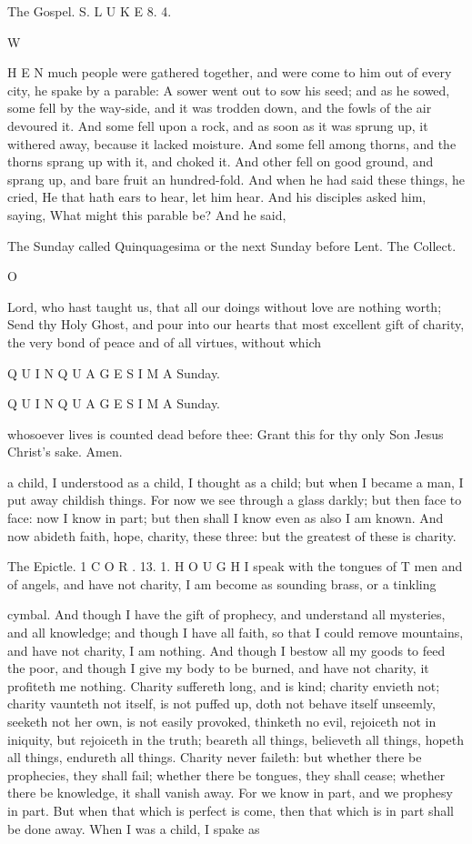 The Gospel. S. L U K E 8. 4.

W

H E N much people were gathered together, and were come to him out of every city, he spake by a parable: A sower went out to sow his seed; and as he sowed, some fell by the way-side, and it was trodden down, and the fowls of the air devoured it. And some fell upon a rock, and as soon as it was sprung up, it withered away, because it lacked moisture. And some fell among thorns, and the thorns sprang up with it, and choked it. And other fell on good ground, and sprang up, and bare fruit an hundred-fold. And when he had said these things, he cried, He that hath ears to hear, let him hear. And his disciples asked him, saying, What might this parable be? And he said,

The Sunday called Quinquagesima or the next Sunday before Lent. The Collect.

O

Lord, who hast taught us, that all our doings without love are nothing worth; Send thy Holy Ghost, and pour into our hearts that most excellent gift of charity, the very bond of peace and of all virtues, without which

Q U I N Q U A G E S I M A Sunday.

Q U I N Q U A G E S I M A Sunday.

whosoever lives is counted dead before thee: Grant this for thy only Son Jesus Christ's sake. Amen.

a child, I understood as a child, I thought as a child; but when I became a man, I put away childish things. For now we see through a glass darkly; but then face to face: now I know in part; but then shall I know even as also I am known. And now abideth faith, hope, charity, these three: but the greatest of these is charity.

The Epictle. 1 C O R . 13. 1. H O U G H I speak with the tongues of T men and of angels, and have not charity, I am become as sounding brass, or a tinkling

cymbal. And though I have the gift of prophecy, and understand all mysteries, and all knowledge; and though I have all faith, so that I could remove mountains, and have not charity, I am nothing. And though I bestow all my goods to feed the poor, and though I give my body to be burned, and have not charity, it profiteth me nothing. Charity suffereth long, and is kind; charity envieth not; charity vaunteth not itself, is not puffed up, doth not behave itself unseemly, seeketh not her own, is not easily provoked, thinketh no evil, rejoiceth not in iniquity, but rejoiceth in the truth; beareth all things, believeth all things, hopeth all things, endureth all things. Charity never faileth: but whether there be prophecies, they shall fail; whether there be tongues, they shall cease; whether there be knowledge, it shall vanish away. For we know in part, and we prophesy in part. But when that which is perfect is come, then that which is in part shall be done away. When I was a child, I spake as


